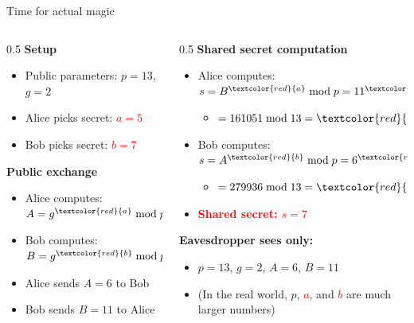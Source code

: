 \ifdefined\PRESENTATION\else\PassOptionsToClass{handout}{beamer}\fi\documentclass[aspectratio=169, lualatex]{beamer}
\begin{document}
\begin{frame}{Time for actual magic}
	\begin{columns}[c]
		\begin{column}{0.5\textwidth}
			\textbf{Setup}
			\begin{itemize}[<+->]
				\item Public parameters: $p = 13$, $g = 2$
				\item Alice picks secret: \textcolor{red}{$a = 5$}
				\item Bob picks secret: \textcolor{red}{$b = 7$}
			\end{itemize}
			\pause
			\vspace{0.3cm}
			\textbf{Public exchange}
			\begin{itemize}[<+->]
				\item Alice computes: $A = g^{\textcolor{red}{a}} \bmod p = 6$
				\item Bob computes: $B = g^{\textcolor{red}{b}} \bmod p = 11$
				\item Alice sends $A = 6$ to Bob
				\item Bob sends $B = 11$ to Alice
			\end{itemize}
		\end{column}
		\begin{column}{0.5\textwidth}
			\pause
			\textbf{Shared secret computation}
			\begin{itemize}[<+->]
				\item Alice computes: $s = B^{\textcolor{red}{a}} \bmod p = 11^{\textcolor{red}{5}} \bmod 13$
				      \begin{itemize}
					      \item $= 161051 \bmod 13 = \textcolor{red}{7}$
				      \end{itemize}
				\item Bob computes: $s = A^{\textcolor{red}{b}} \bmod p = 6^{\textcolor{red}{7}} \bmod 13$
				      \begin{itemize}
					      \item $= 279936 \bmod 13 = \textcolor{red}{7}$
				      \end{itemize}
				\item \textcolor{red}{\textbf{Shared secret: $s = 7$}}
			\end{itemize}
			\pause
			\vspace{0.3cm}
			\textbf{Eavesdropper sees only:}
			\begin{itemize}[<+->]
				\item $p = 13$, $g = 2$, $A = 6$, $B = 11$
				\item (In the real world, $p$, \textcolor{red}{$a$}, and \textcolor{red}{$b$} are much larger numbers)
			\end{itemize}
		\end{column}
	\end{columns}
\end{frame}
\end{document}
